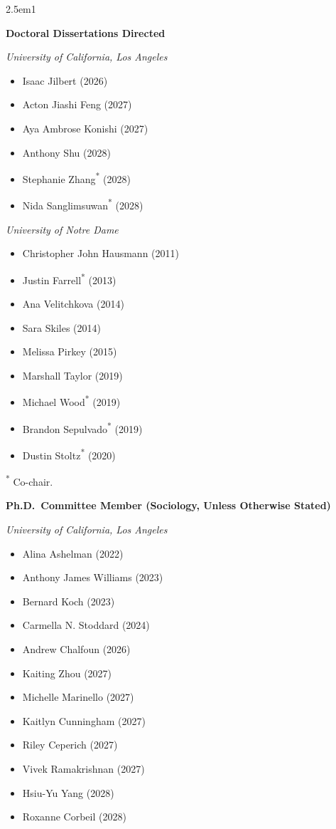 \documentclass[
]{article}
\providecommand{\tightlist}{%
  \setlength{\itemsep}{0pt}\setlength{\parskip}{0pt}}
\newenvironment{cventry}{\begin{hangparas}{2.5em}{1}}{\end{hangparas}}
\begin{document}
\begin{cventry}

\textbf{Doctoral Dissertations Directed }

\emph{University of California, Los Angeles}

\begin{itemize}
\tightlist
\item
  Isaac Jilbert (2026)
\item
  Acton Jiashi Feng (2027)
\item
  Aya Ambrose Konishi (2027)
\item
  Anthony Shu (2028)
\item
  Stephanie Zhang\textsuperscript{*} (2028)
\item
  Nida Sanglimsuwan\textsuperscript{*} (2028)
\end{itemize}

\emph{University of Notre Dame}

\begin{itemize}
\tightlist
\item
  Christopher John Hausmann (2011)
\item
  Justin Farrell\textsuperscript{*} (2013)
\item
  Ana Velitchkova (2014)
\item
  Sara Skiles (2014)
\item
  Melissa Pirkey (2015)
\item
  Marshall Taylor (2019)
\item
  Michael Wood\textsuperscript{*} (2019)
\item
  Brandon Sepulvado\textsuperscript{*} (2019)
\item
  Dustin Stoltz\textsuperscript{*} (2020)
\end{itemize}

\textsuperscript{*} Co-chair.

\textbf{Ph.D.~Committee Member (Sociology, Unless Otherwise Stated)}

\emph{University of California, Los Angeles}

\begin{itemize}
\tightlist
\item
  Alina Ashelman (2022)
\item
  Anthony James Williams (2023)
\item
  Bernard Koch (2023)
\item
  Carmella N. Stoddard (2024)
\item
  Andrew Chalfoun (2026)
\item
  Kaiting Zhou (2027)
\item
  Michelle Marinello (2027)
\item
  Kaitlyn Cunningham (2027)
\item
  Riley Ceperich (2027)
\item
  Vivek Ramakrishnan (2027)
\item
  Hsiu-Yu Yang (2028)
\item
  Roxanne Corbeil (2028)
\end{itemize}


\end{cventry}
\end{document}
